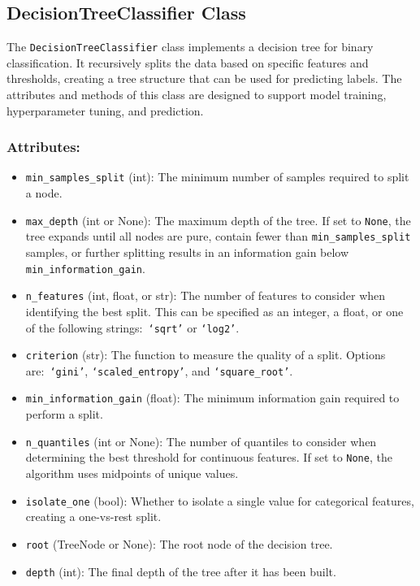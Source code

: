 \documentclass{article}
\begin{document}
\subsection{DecisionTreeClassifier Class}

The \texttt{DecisionTreeClassifier} class implements a decision tree for binary classification. It recursively splits the data based on specific features and thresholds, creating a tree structure that can be used for predicting labels. The attributes and methods of this class are designed to support model training, hyperparameter tuning, and prediction.

\subsubsection*{Attributes:}
\begin{itemize}
    \item \texttt{min\_samples\_split} (int): The minimum number of samples required to split a node.
    \item \texttt{max\_depth} (int or None): The maximum depth of the tree. If set to \texttt{None}, the tree expands until all nodes are pure, contain fewer than \texttt{min\_samples\_split} samples, or further splitting results in an information gain below \texttt{min\_information\_gain}.
    \item \texttt{n\_features} (int, float, or str): The number of features to consider when identifying the best split. This can be specified as an integer, a float, or one of the following strings:\ \texttt{`sqrt'} or \texttt{`log2'}.
    \item \texttt{criterion} (str): The function to measure the quality of a split. Options are:\ \texttt{`gini'}, \texttt{`scaled\_entropy'}, and \texttt{`square\_root'}.
    \item \texttt{min\_information\_gain} (float): The minimum information gain required to perform a split.
    \item \texttt{n\_quantiles} (int or None): The number of quantiles to consider when determining the best threshold for continuous features. If set to \texttt{None}, the algorithm uses midpoints of unique values.
    \item \texttt{isolate\_one} (bool): Whether to isolate a single value for categorical features, creating a one-vs-rest split.
    \item \texttt{root} (TreeNode or None): The root node of the decision tree.
    \item \texttt{depth} (int): The final depth of the tree after it has been built.
\end{itemize}
\end{document}
